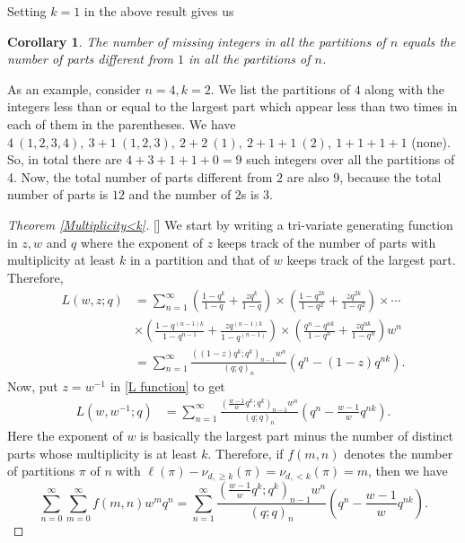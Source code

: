 \documentclass[12pt,reqno]{amsart}
\renewcommand{\(}{\left\(}
\renewcommand{\)}{\right\)}
\renewcommand{\[}{\left\[}
\renewcommand{\]}{\right\]}
\numberwithin{equation}{section}
\theoremstyle{plain}
\newtheorem{corollary}[theorem]{Corollary}
\begin{document}
Setting $k=1$ in the above result gives us
\begin{corollary}
The number of missing integers in all the partitions of $n$ equals the number of parts different from $1$ in all the partitions of $n$.
\end{corollary}
As an example, consider $n=4, k=2$. We list the partitions of $4$ along with the integers less than or equal to the largest part which appear less than two times in each of them in the parentheses. We have $4 \ (1, 2, 3, 4), \ 3+1 \ (1,2,3), \ 2+2 \ (1), \ 2+1+1 \ (2), \ 1+1+1+1$ (none). So, in total there are $4+3+1+1+0 = 9$ such integers over all the partitions of 4. Now, the total number of parts different from $2$ are also $9$, because the total number of parts is $12$ and the number of $2$s is $3$. 
\begin{proof}[Theorem \textup{\ref{Multiplicity<k}}][]
We start by writing a tri-variate generating function in $z,w$ and $q$ where the exponent of $z$ keeps track of the number of parts with multiplicity at least $k$ in a partition and that of $w$ keeps track of the largest part. Therefore,
\begin{align}
L(w,z;q)&=\sum_{n=1}^{\infty}\left(\frac{1-q^k}{1-q}+\frac{zq^k}{1-q}\right) \times \left(\frac{1-q^{2k}}{1-q^2}+\frac{zq^{2k}}{1-q^2}\right) \times\cdots\nonumber\\
&\times\left(\frac{1-q^{(n-1)k}}{1-q^{n-1}}+\frac{zq^{(n-1)k}}{1-q^{(n-1)}}\right) \times\left(\frac{q^n-q^{nk}}{1-q^{n}}+\frac{zq^{nk}}{1-q^n}\right)w^n\nonumber\\
&=\sum_{n=1}^{\infty}\frac{\left((1-z)q^k;q^k\right)_{n-1}w^n}{(q;q)_n}\left(q^n-(1-z)q^{nk}\right)\label{L function}.
\end{align}
Now, put $z=w^{-1}$ in \eqref{L function} to get
\begin{align*}
L(w,w^{-1};q)&=\sum_{n=1}^{\infty}\frac{\left(\frac{w-1}{w}q^k;q^k\right)_{n-1}w^n}{(q;q)_n}\left(q^n-\frac{w-1}{w}q^{nk}\right)\label{L(w,w^-1)}.
\end{align*}
Here the exponent of $w$ is basically the largest part minus the number of distinct parts whose multiplicity is at least $k$. Therefore, if $f(m, n)$ denotes the number of partitions $\pi$ of $n$ with $\ell(\pi) - \nu_{d,\geq k}(\pi) = \nu_{d, < k}(\pi) = m$, then we have
\begin{equation}\label{diff}
\sum_{n=0}^{\infty} \sum_{m=0}^{\infty} f(m, n) w^m q^n = \sum_{n=1}^{\infty}\frac{\left(\frac{w-1}{w}q^k;q^k\right)_{n-1}w^n}{(q;q)_n}\left(q^n-\frac{w-1}{w}q^{nk}\right).

\end{equation}
\end{proof}
\end{document}

